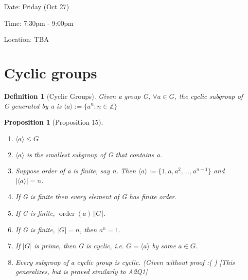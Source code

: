 \documentclass[11pt, oneside]{book}
\theoremstyle{break}
\newtheorem{propo}{Proposition}[section]
\newtheorem{defn}{Definition}[section]
\newcommand{\bb}[1]{\mathbb{#1}}			%
\DeclareMathOperator{\order}{order}
\begin{document}
Date: Friday (Oct 27)

Time: 7:30pm - 9:00pm

Location: TBA

\section{Cyclic groups}\label{sect:cyclic groups}

\begin{defn}[Cyclic Groups]
    Given a group G, $\forall a \in G$, the cyclic subgroup of G generated by a is $\langle a \rangle := \{a^n : n \in \bb{Z} \}$
\end{defn}

\begin{propo}[Proposition 15]\label{propo:15}
    \begin{enumerate}
        \item $\langle a \rangle \leq G$
        \item $\langle a \rangle$ is the smallest subgroup of G that contains a.
        \item Suppose order of a is finite, say n. Then $\langle a \rangle := \{1, a, a^2, ..., a^{n - 1}\}$ and $|\langle a \rangle| = n$.
        \item If G is finite then every element of G has finite order.
        \item If G is finite, $\order(a) \Big| |G|$.
        \item If G is finite, $|G| = n$, then $a^n = 1$.
        \item If $|G|$ is prime, then G is cyclic, i.e. $G = \langle a \rangle$ by some $a \in G$.
        \item Every subgroup of a cyclic group is cyclic. (Given without proof :( ) [This generalizes, but is proved similarly to A2Q1]
    \end{enumerate}
\end{propo}
\end{document}
